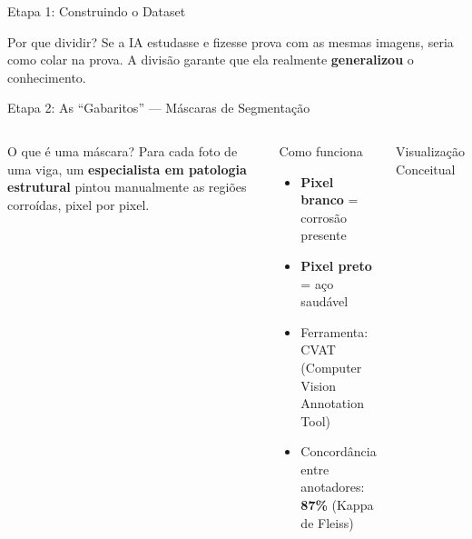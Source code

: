 \documentclass[aspectratio=169, 12pt]{beamer}
\begin{document}
\begin{frame}{Etapa 1: Construindo o Dataset}
    \vspace{0.3cm}

    \begin{alertblock}{Por que dividir?}
        Se a IA estudasse e fizesse prova com as mesmas imagens, seria como colar na prova. A divisão garante que ela realmente \textbf{generalizou} o conhecimento.
    \end{alertblock}
\end{frame}

\begin{frame}{Etapa 2: As ``Gabaritos'' --- Máscaras de Segmentação}
    \begin{columns}[T]
        \begin{block}{O que é uma máscara?}
            Para cada foto de uma viga, um \textbf{especialista em patologia estrutural} pintou manualmente as regiões corroídas, pixel por pixel.
        \end{block}

        \vspace{0.2cm}

        \begin{block}{Como funciona}
            \begin{itemize}
                \item \textbf{Pixel branco} = corrosão presente
                \item \textbf{Pixel preto} = aço saudável
                \item Ferramenta: CVAT (Computer Vision Annotation Tool)
                \item Concordância entre anotadores: \textbf{87\%} (Kappa de Fleiss)
            \end{itemize}
        \end{block}

        \begin{block}{Visualização Conceitual}
            \begin{center}
\end{center}
\end{block}
\end{columns}
\end{frame}
\end{document}
